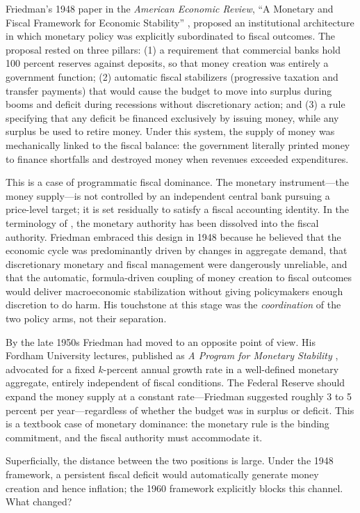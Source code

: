 \documentclass[12pt]{article}
\begin{document}
Friedman's 1948 paper in the \textit{American Economic Review},
``A Monetary and Fiscal Framework for Economic Stability''
\citep{Friedman1948}, proposed an institutional architecture in which
monetary policy was explicitly subordinated to fiscal outcomes.  The
proposal rested on three pillars: (1) a requirement that commercial banks
hold 100 percent reserves against deposits, so that money creation was
entirely a government function; (2) automatic fiscal stabilizers
(progressive taxation and transfer payments) that would cause the budget
to move into surplus during booms and deficit during recessions without
discretionary action; and (3) a rule specifying that any deficit be
financed exclusively by issuing money, while any surplus be used to
retire money.  Under this system, the supply of money was mechanically
linked to the fiscal balance: the government literally printed money
to finance shortfalls and destroyed money when revenues exceeded
expenditures.

This is a case of programmatic fiscal dominance.  The monetary
instrument---the money supply---is not controlled by an independent
central bank pursuing a price-level target; it is set residually to
satisfy a fiscal accounting identity.  In the terminology of
\citet{Sargent2011}, the monetary authority has been dissolved into
the fiscal authority.  Friedman embraced this design in 1948 because he
believed that the economic cycle was predominantly driven by changes in
aggregate demand, that discretionary monetary and fiscal management were
dangerously unreliable, and that the automatic, formula-driven coupling
of money creation to fiscal outcomes would deliver macroeconomic
stabilization without giving policymakers enough discretion to do harm.
His touchstone at this stage was the \textit{coordination} of the two
policy arms, not their separation.

By the late 1950s Friedman had moved to an opposite point of view.  His Fordham University
lectures, published as \textit{A Program for Monetary Stability}
\citep{Friedman1960}, advocated for a fixed $k$-percent annual growth
rate in a well-defined monetary aggregate, entirely independent of
fiscal conditions.  The Federal Reserve should expand the money supply
at a constant rate---Friedman suggested roughly 3 to 5 percent per
year---regardless of whether the budget was in surplus or deficit.
This is a textbook case of monetary dominance: the monetary rule is the
binding commitment, and the fiscal authority must accommodate it.

Superficially, the  distance between the two positions is large.  Under
the 1948 framework, a persistent fiscal deficit would automatically
generate money creation and hence inflation; the 1960 framework
explicitly blocks this channel.  What changed?
\end{document}
